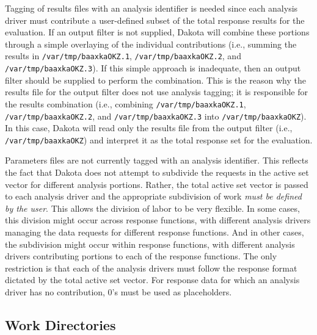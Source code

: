 Tagging of results files with an analysis identifier is needed
since each analysis driver must contribute a
user-defined subset of the total response results for the evaluation.
If an output filter is not supplied, Dakota will combine these
portions through a simple overlaying of the individual contributions
(i.e., summing the results in \texttt{/var/tmp/baaxkaOKZ.1},
\texttt{/var/tmp/baaxkaOKZ.2}, and \texttt{/var/tmp/baaxkaOKZ.3}). If
this simple approach is inadequate, then an output filter should be
supplied to perform the combination. This is the reason why the
results file for the output filter does not use analysis tagging; it
is responsible for the results combination (i.e., combining
\texttt{/var/tmp/baaxkaOKZ.1}, \texttt{/var/tmp/baaxkaOKZ.2}, and
\texttt{/var/tmp/baaxkaOKZ.3} into \texttt{/var/tmp/baaxkaOKZ}). In
this case, Dakota will read only the results file from the output
filter (i.e., \texttt{/var/tmp/baaxkaOKZ}) and interpret it as the
total response set for the evaluation.

Parameters files are not currently tagged with an analysis identifier.
This reflects the fact that Dakota does not attempt to subdivide the
requests in the active set vector for different analysis portions.
Rather, the total active set vector is passed to each analysis driver
and the appropriate subdivision of work \emph{must be defined by the
  user}. This allows the division of labor to be very flexible. In
some cases, this division might occur across response functions, with
different analysis drivers managing the data requests for different
response functions. And in other cases, the subdivision might occur
within response functions, with different analysis drivers
contributing portions to each of the response functions. The only
restriction is that each of the analysis drivers must follow the
response format dictated by the total active set vector. For response
data for which an analysis driver has no contribution, 0's must be
used as placeholders.

\subsection{Work Directories}\label{interfaces:workdir}


